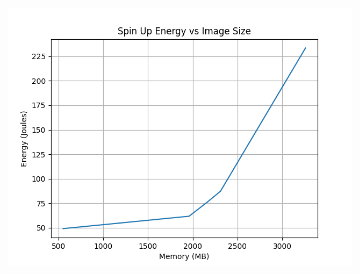 \documentclass[times, 10pt,twocolumn]{article}
\begin{document}
\begin{figure}[ht]
\begin{subfigure}[b]{0.3\textwidth}
      \includegraphics[width=\textwidth]{imgs/container_study/spin_up_vs_image.png}
     \caption{}
     \label{fig:spin_up_img}
   \end{subfigure}
   

\end{figure}
\end{document}
